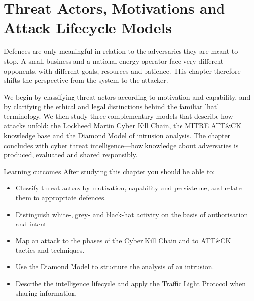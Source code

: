 \chapter{Threat Actors, Motivations and Attack Lifecycle Models}\label{ch:3}

Defences are only meaningful in relation to the adversaries they are meant to stop. A small business and a national energy operator face very different opponents, with different goals, resources and patience. This chapter therefore shifts the perspective from the system to the attacker.

We begin by classifying threat actors according to motivation and capability, and by clarifying the ethical and legal distinctions behind the familiar 'hat' terminology. We then study three complementary models that describe how attacks unfold: the Lockheed Martin Cyber Kill Chain, the MITRE ATT\&CK knowledge base and the Diamond Model of intrusion analysis. The chapter concludes with cyber threat intelligence—how knowledge about adversaries is produced, evaluated and shared responsibly.

\begin{outcomesbox}{Learning outcomes}
After studying this chapter you should be able to:
\begin{itemize}
  \item Classify threat actors by motivation, capability and persistence, and relate them to appropriate defences.
  \item Distinguish white-, grey- and black-hat activity on the basis of authorisation and intent.
  \item Map an attack to the phases of the Cyber Kill Chain and to ATT\&CK tactics and techniques.
  \item Use the Diamond Model to structure the analysis of an intrusion.
  \item Describe the intelligence lifecycle and apply the Traffic Light Protocol when sharing information.
\end{itemize}
\end{outcomesbox}

